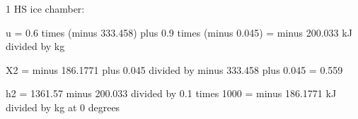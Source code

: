 1 HS ice chamber:  

u = 0.6 times (minus 333.458) plus 0.9 times (minus 0.045) = minus 200.033 kJ divided by kg  

X2 = minus 186.1771 plus 0.045 divided by minus 333.458 plus 0.045 = 0.559  

h2 = 1361.57 minus 200.033 divided by 0.1 times 1000 = minus 186.1771 kJ divided by kg at 0 degrees